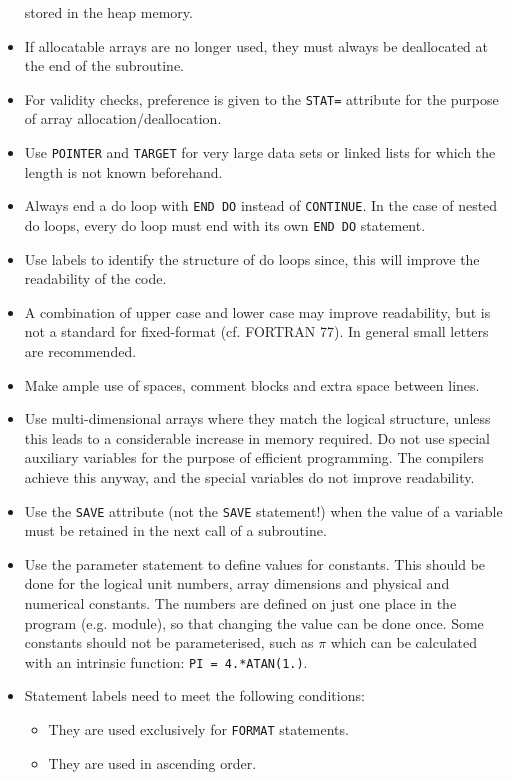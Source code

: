 \documentclass[12pt]{book}
\begin{document}
\begin{itemize}
        stored in the heap memory.
  \item If allocatable arrays are no longer used, they must always be deallocated at the end of the subroutine.
  \item For validity checks, preference is given to the {\tt STAT=} attribute for the purpose of array allocation/deallocation.
  \item Use {\tt POINTER} and {\tt TARGET} for very large data sets or linked lists for which the length
        is not known beforehand.
  \item Always end a do loop with {\tt END DO} instead of {\tt CONTINUE}. In the case of nested do loops, every do
        loop must end with its own {\tt END DO} statement.
  \item Use labels to identify the structure of do loops since, this will improve the readability of the
        code.
  \item A combination of upper case and lower case may improve readability, but is not a standard for
        fixed-format (cf. FORTRAN 77). In general small letters are recommended.
  \item Make ample use of spaces, comment blocks and extra space between lines.
  \item Use multi-dimensional arrays where they match the logical structure, unless this leads to a
        considerable increase in memory required. Do not use special auxiliary variables for the purpose
        of efficient programming. The compilers achieve this anyway, and the special variables do not
        improve readability.
  \item Use the {\tt SAVE} attribute (not the {\tt SAVE} statement!) when the value of a variable
        must be retained in the next call of a subroutine.
  \item Use the parameter statement to define values for constants. This should be done for the logical
        unit numbers, array dimensions and physical and numerical constants. The numbers are defined
        on just one place in the program (e.g. module), so that changing the value can be done once.
        Some constants should not be parameterised, such as $\pi$ which can be calculated with an
        intrinsic function: {\tt PI = 4.*ATAN(1.)}.
  \item Statement labels need to meet the following conditions:
        \begin{itemize}
          \item They are used exclusively for {\tt FORMAT} statements.
          \item They are used in ascending order.

\end{itemize}
\end{itemize}
\end{document}
